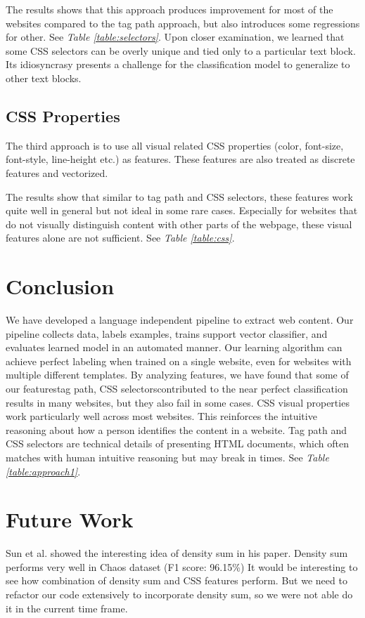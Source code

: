 \documentclass{acm_proc_article-sp}
\begin{document}
The results shows that this approach produces improvement for most of the websites compared to the tag path approach, but also introduces some regressions for other. See \emph{Table \ref{table:selectors}}. Upon closer examination, we learned that some CSS selectors can be overly unique and tied only to a particular text block. Its idiosyncrasy presents a challenge for the classification model to generalize to other text blocks.

\subsection{CSS Properties}

The third approach is to use all visual related CSS properties (color, font-size, font-style, line-height etc.) as features. These features are also treated as discrete features and vectorized.

The results show that similar to tag path and CSS selectors, these features work quite well in general but not ideal in some rare cases. Especially for websites that do not visually distinguish content with other parts of the webpage, these visual features alone are not sufficient. See \emph{Table \ref{table:css}}.


\section{Conclusion}

We have developed a language independent pipeline to extract web content. Our pipeline collects data, labels examples, trains support vector classifier, and evaluates learned model in an automated manner. Our learning algorithm can achieve perfect labeling when trained on a single website, even for websites with multiple different templates. By analyzing features, we have found that some of our features\textemdash tag path, CSS selectors\textemdash contributed to the near perfect classification results in many websites, but they also fail in some cases. CSS visual properties work particularly well across most websites. This reinforces the intuitive reasoning about how a person identifies the content in a website. Tag path and CSS selectors are technical details of presenting HTML documents, which often matches with human intuitive reasoning but may break in times. See \emph{Table \ref{table:approach1}}.

\section{Future Work}
Sun et al.\cite{sun2011dom} showed the interesting idea of density sum in his paper. Density sum performs very well in Chaos dataset (F1 score: 96.15\%) It would be interesting to see how combination of density sum and CSS features perform. But we need to refactor our code extensively to incorporate density sum, so we were not able do it in the current time frame.









\end{document}
